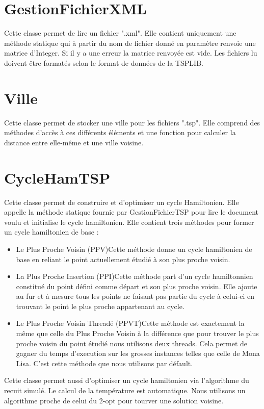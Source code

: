 \documentclass{article}
\begin{document}
\section{GestionFichierXML}

Cette classe permet de lire un fichier ".xml". Elle contient uniquement une méthode statique qui à partir du nom de fichier donné en paramètre renvoie une matrice d'Integer. Si il y a une erreur la matrice renvoyée est vide.
Les fichiers lu doivent être formatés selon le format de données de la TSPLIB.

\section{Ville}

Cette classe permet de stocker une ville pour les fichiers ".tsp". Elle comprend des méthodes d'accès à ces différents éléments et une fonction pour calculer la distance entre elle-même et une ville voisine.

\section{CycleHamTSP}

Cette classe permet de construire et d'optimiser un cycle Hamiltonien.
Elle appelle la méthode statique fournie par GestionFichierTSP pour lire le document voulu et initialise le cycle hamiltonien.
Elle contient trois méthodes pour former un cycle hamiltonien de base :
\begin{itemize}
\item{Le Plus Proche Voisin (PPV)}{Cette méthode donne un cycle hamiltonien de base en reliant le point actuellement étudié à son plus proche voisin.}
\item{La Plus Proche Insertion (PPI)}{Cette méthode part d'un cycle hamiltonnien constitué du point défini comme départ et son plus proche voisin. Elle ajoute au fur et à mesure tous les points ne faisant pas partie du cycle à celui-ci en trouvant le point le plus proche appartenant au cycle.}
\item{Le Plus Proche Voisin Threadé (PPVT)}{Cette méthode est exactement la même que celle du Plus Proche Voisin à la différence que pour trouver le plus proche voisin du point étudié nous utilisons deux threads. Cela permet de gagner du temps d'execution sur les grosses instances telles que celle de Mona Lisa. C'est cette méthode que nous utilisons par défault.}
\end{itemize}
Cette classe permet aussi d'optimiser un cycle hamiltonien via l'algorithme du recuit simulé. Le calcul de la température est automatique. Nous utilisons un algorithme proche de celui du 2-opt pour tourver une solution voisine.
\end{document}

